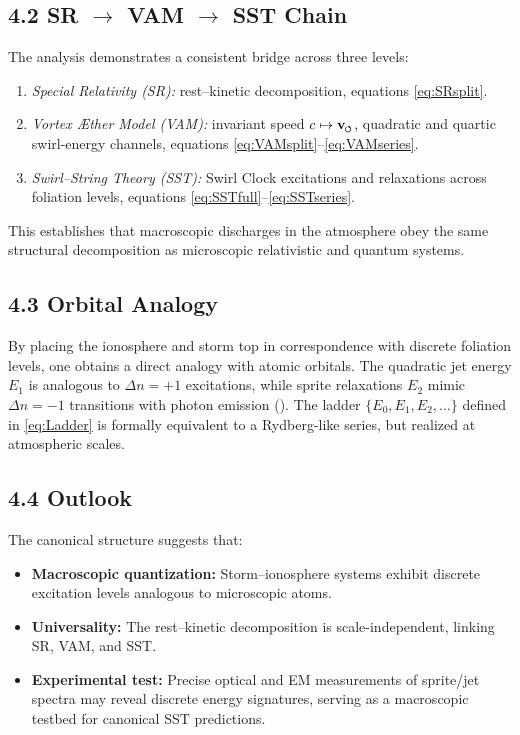 \documentclass[reprint,aps,onecolumn,nofootinbib]{revtex4-2}
\newcommand{\swirlarrow}{%
    \mathchoice{\mkern-2mu\scriptstyle\boldsymbol{\circlearrowleft}}%
    {\mkern-2mu\scriptstyle\boldsymbol{\circlearrowleft}}%
    {\mkern-2mu\scriptscriptstyle\boldsymbol{\circlearrowleft}}%
    {\mkern-2mu\scriptscriptstyle\boldsymbol{\circlearrowleft}}%
}
\newcommand{\vswirl}{\mathbf{v}_{\swirlarrow}}
\newcommand{\Ce}{\vswirl}
\begin{document}
\subsection*{4.2 SR $\to$ VAM $\to$ SST Chain}

    The analysis demonstrates a consistent bridge across three levels:

    \begin{enumerate}
    \item \emph{Special Relativity (SR):} rest--kinetic decomposition,
    equations \eqref{eq:SRsplit}.
    \item \emph{Vortex \AE ther Model (VAM):} invariant speed $c\mapsto \Ce$,
    quadratic and quartic swirl-energy channels,
    equations \eqref{eq:VAMsplit}--\eqref{eq:VAMseries}.
    \item \emph{Swirl--String Theory (SST):} Swirl Clock excitations and
    relaxations across foliation levels,
    equations \eqref{eq:SSTfull}--\eqref{eq:SSTseries}.
    \end{enumerate}

    This establishes that macroscopic discharges in the atmosphere
    obey the same structural decomposition as microscopic relativistic
    and quantum systems.

\subsection*{4.3 Orbital Analogy}

    By placing the ionosphere and storm top in correspondence with
    discrete foliation levels, one obtains a direct analogy with atomic
    orbitals. The quadratic jet energy $E_1$ is analogous to
    $\Delta n = +1$ excitations, while sprite relaxations $E_2$ mimic
    $\Delta n = -1$ transitions with photon emission
    (\cite{Bohr1913Hydrogen,Dirac1928Electron,BetheSalpeter1957}).
    The ladder $\{E_0,E_1,E_2,\dots\}$ defined in
    \eqref{eq:Ladder} is formally equivalent to a Rydberg-like
    series, but realized at atmospheric scales.

\subsection*{4.4 Outlook}

    The canonical structure suggests that:

    \begin{itemize}
    \item \textbf{Macroscopic quantization:} Storm--ionosphere systems
    exhibit discrete excitation levels analogous to microscopic atoms.
    \item \textbf{Universality:} The rest--kinetic decomposition is
    scale-independent, linking SR, VAM, and SST.
    \item \textbf{Experimental test:} Precise optical and EM measurements
    of sprite/jet spectra may reveal discrete energy signatures,
    serving as a macroscopic testbed for canonical SST predictions.
    \end{itemize}
\end{document}
